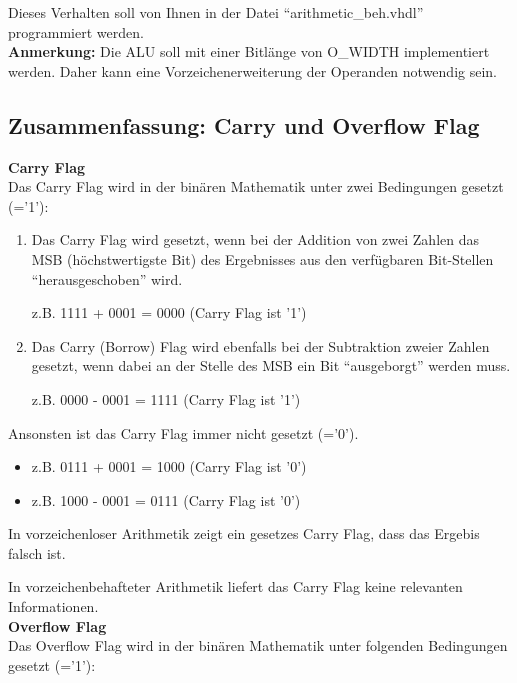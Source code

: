 \documentclass[a4paper,12pt]{article}
\begin{document}
Dieses Verhalten soll von Ihnen in der Datei "`arithmetic\_beh.vhdl"' programmiert werden.
\\

\textbf{Anmerkung:} Die ALU soll mit einer Bitl\"ange von {{O_WIDTH}} implementiert werden. Daher kann eine Vorzeichenerweiterung der Operanden notwendig sein.

\newpage
\subsection*{Zusammenfassung: Carry und Overflow Flag}

\textbf{Carry Flag}\\
Das Carry Flag wird in der bin\"aren Mathematik unter zwei Bedingungen gesetzt (='1'):
\begin{enumerate}
\item Das Carry Flag wird gesetzt, wenn bei der Addition von zwei Zahlen das MSB (h\"ochstwertigste Bit) des Ergebnisses aus den verf\"ugbaren Bit-Stellen "`herausgeschoben"' wird.

   z.B. 1111 + 0001 = 0000 (Carry Flag ist '1')

\item Das Carry (Borrow) Flag wird ebenfalls bei der Subtraktion zweier Zahlen gesetzt, wenn dabei an der Stelle des MSB ein Bit "`ausgeborgt"' werden muss.

   z.B. 0000 - 0001 = 1111 (Carry Flag ist '1')
\end{enumerate}

Ansonsten ist das Carry Flag immer nicht gesetzt (='0').

\begin{itemize}
\item z.B. 0111 + 0001 = 1000 (Carry Flag ist '0')
\item z.B. 1000 - 0001 = 0111 (Carry Flag ist '0')
\end{itemize}


In vorzeichenloser Arithmetik zeigt ein gesetzes Carry Flag, dass das Ergebis falsch ist.

In vorzeichenbehafteter Arithmetik liefert das Carry Flag keine relevanten Informationen.
\\

\textbf{Overflow Flag}\\
Das Overflow Flag wird in der bin\"aren Mathematik unter folgenden Bedingungen gesetzt (='1'):
\end{document}
